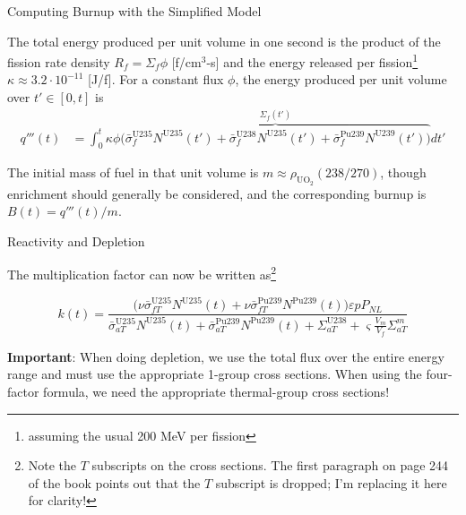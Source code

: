 \documentclass[aspectratio=1610]{beamer}
\begin{document}
\begin{frame}[fragile]{Computing Burnup with the Simplified Model}
 
The total energy produced per unit volume in one second is the product of the fission rate density $R_f = \Sigma_f \phi$ [f/cm$^3$-s] and the energy released per fission\footnote{assuming the usual 200 MeV per fission} $\kappa \approx 3.2\cdot 10^{-11}$ [J/f].  For a constant flux $\phi$, the energy produced per unit volume over $t' \in [0, t]$ is
\begin{align*}
q'''(t)
   &=  \int^t_0 \kappa \phi \overbrace{ \Big(\bar{\sigma}^{\text{U}235}_{f} N^{\text{U}235}(t') 
       + \bar{\sigma}^{\text{U}238}_{f} N^{\text{U}235}(t') 
       + \bar{\sigma}^{\text{Pu}239}_f N^{\text{U}239}(t') \Big )}^{\Sigma_f(t')} dt'
\end{align*}

The initial mass of fuel in that unit volume is $m \approx \rho_{\text{UO}_2} (238/270)$, though enrichment should generally be considered, and the corresponding burnup is $B(t) = q'''(t)/m$.

\end{frame}


\begin{frame}[fragile]{Reactivity and Depletion}
 


The multiplication factor can now be written as\footnote{Note the $T$ subscripts on the cross sections. The first paragraph on page 244 of the book points out that the $T$ subscript is dropped; I'm replacing it here for clarity!} 

\begin{equation*}
  \tag{10.39}
  k(t) = \frac{\big(\nu\bar{\sigma}^{\text{U}235}_{fT} N^{\text{U}235}(t) + \nu\bar{\sigma}^{\text{Pu}239}_{fT} N^{\text{Pu}239}(t)\big)\varepsilon p P_{NL}}
  {\bar{\sigma}^{\text{U}235}_{aT} N^{\text{U}235}(t) + \bar{\sigma}^{\text{Pu}239}_{aT} N^{\text{Pu}239}(t) + \Sigma_{aT}^{\text{U}238} + \varsigma \frac{V_m }{V_f}\Sigma_{aT}^m}
\end{equation*}



\vfill 

{\bf Important}: When doing depletion, we use the total flux over the entire energy range and must use the appropriate 1-group cross sections.  When using the four-factor formula, we need the appropriate thermal-group cross sections!

\vfill 


\end{frame}
\end{document}
